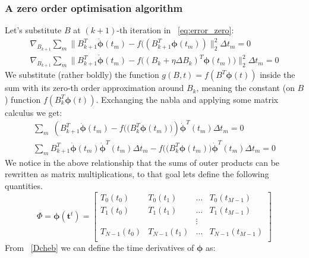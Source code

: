 \documentclass[11pt]{article}
\begin{document}
    \subsubsection{A zero order optimisation algorithm}
    Let's substitute $B$ at $(k+1)$-th iteration in ~\ref{eq:error_zero}:
    \begin{align}
        \nabla_{B_{k+1}} \sum_m \lVert
        B_{k+1}^T \pmb{\dot\phi}(t_m)  -
        f ( (B_{k+1}^T \pmb\phi(t_m)  )
        \rVert^2_2
        \Delta t_m = 0 \\
        \nabla_{B_{k+1}}\sum_m \lVert
        B_{k+1}^T \pmb{\dot\phi}(t_m)  -
        f \big( (B_{k} + \eta \Delta B_k)^T \pmb\phi(t_m)  \big)
        \rVert^2_2
        \Delta t_m = 0 \label{eq:B_inside_f}
    \end{align}
    We substitute (rather boldly) the function $g(B, t) = f(B^T \pmb{\phi}(t) )$ inside the sum with its zero-th order
    approximation around $B_k$, meaning the constant (on $B$) function $f( B_k^T \pmb{\phi}(t) )$.
    Exchanging the nabla and applying some matrix calculus we get:
    \begin{align}
        \sum_m \;
        \left(
        B_{k+1}^T \pmb{\dot\phi}(t_m)  -
        f \big( (B_{k}^T \pmb\phi(t_m)  \big)
        \right)
        \pmb{\dot\phi}^T(t_m)
        \Delta t_m = 0 \\
        \sum_m
        B_{k+1}^T \pmb{\dot\phi}(t_m) \pmb{\dot\phi}^T(t_m) \Delta t_m-
        f \big( (B_{k}^T \pmb\phi(t_m)  \big) \pmb{\dot\phi}^T(t_m) \Delta t_m
        = 0
        \label{eq:grad_err}
    \end{align}
    We notice in the above relationship that the sums of outer products can be rewritten as matrix multiplications, to
    that goal lets define the following quantities.
    \begin{equation*}
        \Phi =  \pmb{\phi}(\pmb{t}^t)  =
        \begin{bmatrix}
            T_0(t_0)     & T_0(t_1)     & \dots & T_{0}(t_{M-1})   \\
            T_1(t_0)     & T_1(t_1)     & \dots & T_1(t_{M-1})     \\
            & & \vdots \\
            T_{N-1}(t_0) & T_{N-1}(t_1) & \dots & T_{N-1}(t_{M-1}) \\
        \end{bmatrix}\label{eq:cheb_mat}
    \end{equation*}
    From ~\eqref{Dcheb} we can define the time derivatives of $\pmb\phi$ as:
\end{document}
